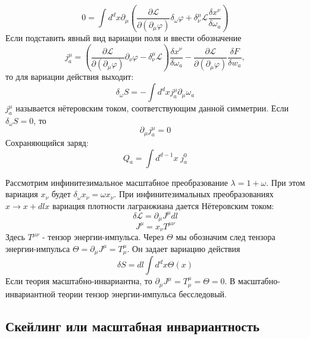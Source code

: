 \documentclass[a4paper,12pt]{article} \usepackage[utf8x]{inputenc} \usepackage[russian]{babel}
\theoremstyle{definition} \newtheorem{corollary}{Corollary}[theorem] \theoremstyle{definition}
\begin{document}
\begin{equation*} 0=\int d^{d}x \partial_{\mu}\left(\frac{\partial
\mathcal{L}}{\partial(\partial_{\mu}\varphi)}\delta_{\omega}\varphi +\delta^{\mu}_{\nu}\mathcal{L}
\frac{\delta x^{\nu}}{\delta \omega_{a}}\right)
\end{equation*} Если подставить явный вид вариации поля и ввести обозначение
\begin{equation*} j^{\mu}_{a}=\left(\frac{\partial
\mathcal{L}}{\partial(\partial_{\mu}\varphi)}\partial_{\nu}\varphi
-\delta^{\mu}_{\nu}\mathcal{L}\right) \frac{\delta x^{\nu}}{\delta \omega_{a}}-\frac{\partial
\mathcal{L}}{\partial(\partial_{\mu}\varphi)}\frac{\delta F}{\delta w_{a}},
\end{equation*} то для вариации действия выходит:
\begin{equation*} \delta_{\omega}S=-\int d^{d}x j^{\mu}_{a}\partial_{\mu}\omega_{a}
\end{equation*} $j^{\mu}_{a}$ называется нётеровским током, соответствующим данной симметрии. Если
$\delta_{\omega} S=0$, то
\begin{equation*}
  \partial_{\mu}j^{\mu}_{a}=0
\end{equation*} Сохраняющийся заряд:
\begin{equation*} Q_{a}=\int d^{d-1}x\; j^{0}_{a}
\end{equation*}

 Рассмотрим инфинитезимальное масштабное преобразование $\lambda=1+\omega$. При этом вариация
$x_{\nu}$ будет $\delta_{\omega}x_{\nu}=\omega x_{\nu}$. При инфинитезимальных преобразованиях $x\to
x+dl x$ вариация плотности лагранжиана дается Нётеровским током:
\begin{equation}
  \label{eq:74} \delta\mathcal{L}=\partial_{\mu}J^{\mu}dl
\end{equation}
\begin{equation}
  \label{eq:75} J^{\mu}=x_{\nu}T^{\mu\nu}
\end{equation} Здесь $T^{\mu\nu}$ - тензор энергии-импульса. Через $\Theta$ мы обозначим след
тензора энергии-импульса $\Theta=\partial_{\mu}J^{\mu}=T_{\mu}^{\mu}$. Он задает вариацию действия
\begin{equation}
  \label{eq:87} \delta S=dl \int d^d x \Theta(x)
\end{equation} Если теория масштабно-инвариантна, то $\partial_{\mu}J^{\mu}=T_{\mu}^{\mu}=\Theta=0$.
В масштабно-инвариантной теории тензор энергии-импульса бесследовый.


\subsection{Скейлинг или масштабная инвариантность}
\label{sec:scaling}
\end{document}
